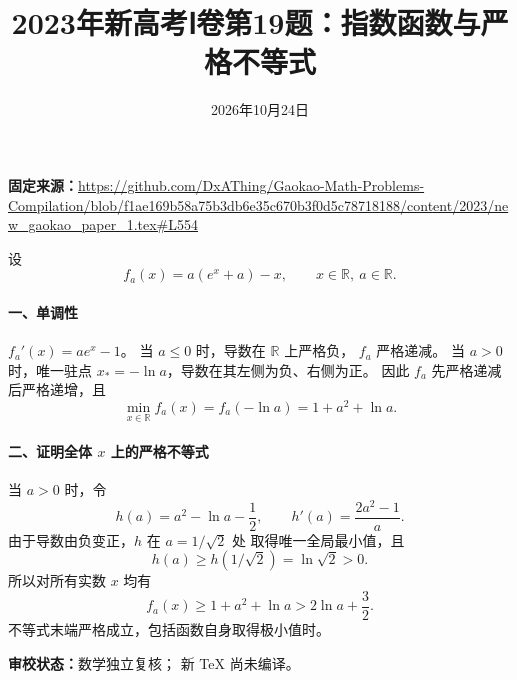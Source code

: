 \documentclass[UTF8,a4paper,11pt]{ctexart}
\title{2023年新高考Ⅰ卷第19题：指数函数与严格不等式}
\date{2026年10月24日}
\begin{document}
\maketitle
\noindent\textbf{固定来源：}\url{https://github.com/DxAThing/Gaokao-Math-Problems-Compilation/blob/f1ae169b58a75b3db6e35c670b3f0d5c78718188/content/2023/new_gaokao_paper_1.tex#L554}

设
\[
f_a(x)=a(e^x+a)-x,\qquad x\in\mathbb R,\ a\in\mathbb R.
\]
\paragraph{一、单调性}
$f_a'(x)=ae^x-1$。
当 $a\le0$ 时，导数在 $\mathbb R$ 上严格负，
$f_a$ 严格递减。
当 $a>0$ 时，唯一驻点
$x_*=-\ln a$，导数在其左侧为负、右侧为正。
因此 $f_a$ 先严格递减后严格递增，且
\[
\min_{x\in\mathbb R}f_a(x)=f_a(-\ln a)
=1+a^2+\ln a.
\]

\paragraph{二、证明全体 $x$ 上的严格不等式}
当 $a>0$ 时，令
\[
h(a)=a^2-\ln a-\frac12,\qquad
h'(a)=\frac{2a^2-1}{a}.
\]
由于导数由负变正，$h$ 在 $a=1/\sqrt2$ 处
取得唯一全局最小值，且
\[
h(a)\ge h(1/\sqrt2)=\ln\sqrt2>0.
\]
所以对所有实数 $x$ 均有
\[
\boxed{f_a(x)\ge1+a^2+\ln a
>2\ln a+\frac32}.
\]
不等式末端严格成立，包括函数自身取得极小值时。

\bigskip
\noindent\textbf{审校状态：}数学独立复核；
新 TeX 尚未编译。
\end{document}
